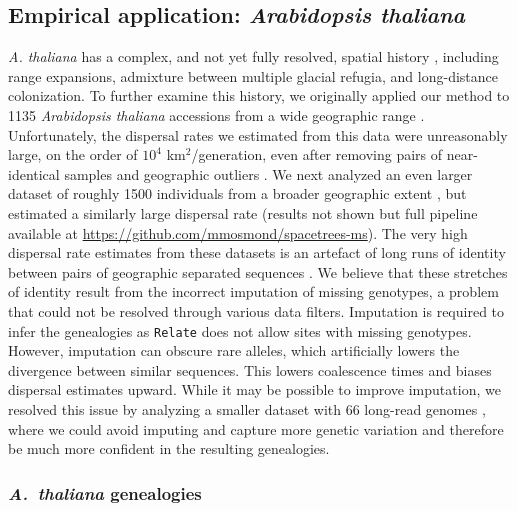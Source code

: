 \documentclass[12pt]{article}
\begin{document}
\subsection*{Empirical application: \textit{Arabidopsis thaliana}}

\textit{A. thaliana} has a complex, and not yet fully resolved, spatial history \citep{fulgione2018archaic,hsu2019postglacial}, including range expansions, admixture between multiple glacial refugia, and long-distance colonization. To further examine this history, we originally applied our method to 1135 \textit{Arabidopsis thaliana} accessions from a wide geographic range \citep{alonso2016}. Unfortunately, the dispersal rates we estimated from this data were unreasonably large, on the order of $10^4$ km$^2$/generation, even after removing pairs of near-identical samples and geographic outliers \citep[for more details see our preprint,][]{osmondcoop2021}. We next analyzed an even larger dataset of roughly 1500 individuals from a broader geographic extent \citep{durvasula2017african}, but estimated a similarly large dispersal rate (results not shown but full pipeline available at \url{https://github.com/mmosmond/spacetrees-ms}). The very high dispersal rate estimates from these datasets is an artefact of long runs of identity between pairs of geographic separated sequences \citep[see Figure S6 of][]{osmondcoop2021}. We believe that these stretches of identity result from the incorrect imputation of missing genotypes, a problem that could not be resolved through various data filters. Imputation is required to infer the genealogies as \texttt{Relate} does not allow sites with missing genotypes. However, imputation can obscure rare alleles, which artificially lowers the divergence between similar sequences. This lowers coalescence times and biases dispersal estimates upward. While it may be possible to improve imputation, we resolved this issue by analyzing a smaller dataset with 66 long-read genomes \citep{wlodzimierz2023cycles}, where we could avoid imputing and capture more genetic variation \citep{igolkina2024towards} and therefore be much more confident in the resulting genealogies. 

\subsubsection*{\textit{A.\ thaliana} genealogies}
\end{document}
